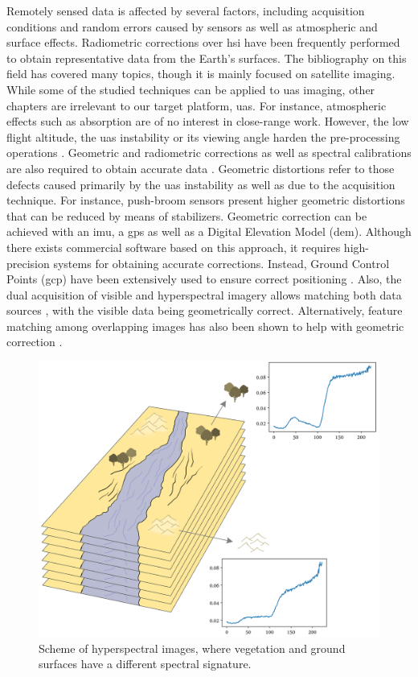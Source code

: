 Remotely sensed data is affected by several factors, including acquisition conditions and random errors caused by sensors as well as atmospheric and surface effects. Radiometric corrections over \acrshort{hsi} have been frequently performed to obtain representative data from the Earth's surfaces. The bibliography on this field has covered many topics, though it is mainly focused on satellite imaging. While some of the studied techniques can be applied to \acrshort{uas} imaging, other chapters are irrelevant to our target platform, \acrshort{uas}. For instance, atmospheric effects such as absorption are of no interest in close-range work. However, the low flight altitude, the \acrshort{uas} instability or its viewing angle harden the pre-processing operations \cite{jakob_need_2017}. Geometric and radiometric corrections as well as spectral calibrations are also required to obtain accurate data \cite{adao_hyperspectral_2017}. Geometric distortions refer to those defects caused primarily by the \acrshort{uas} instability as well as due to the acquisition technique. For instance, push-broom sensors present higher geometric distortions that can be reduced by means of stabilizers. Geometric correction can be achieved with an \acrshort{imu}, a \acrshort{gps} as well as a Digital Elevation Model (\acrshort{dem}). Although there exists commercial software based on this approach, it requires high-precision systems for obtaining accurate corrections. Instead, Ground Control Points (\acrshort{gcp}) have been extensively used to ensure correct positioning \cite{ramirez-paredes_low-altitude_2016}. Also, the dual acquisition of visible and hyperspectral imagery allows matching both data sources \cite{jurado_efficient_2021, xue_compact_2021, ramirez-paredes_low-altitude_2016}, with the visible data being geometrically correct. Alternatively, feature matching among overlapping images has also been shown to help with geometric correction \cite{akhoundi_khezrabad_new_2022}.

\begin{figure}[ht]
	\includegraphics[width=.9\textwidth]{figs/fundamentals/material_hyperspectral.png}
	\caption{Scheme of hyperspectral images, where vegetation and ground surfaces have a different spectral signature.  }
    \label{fig:fundamentals_material_hyperspectral}
\end{figure}

